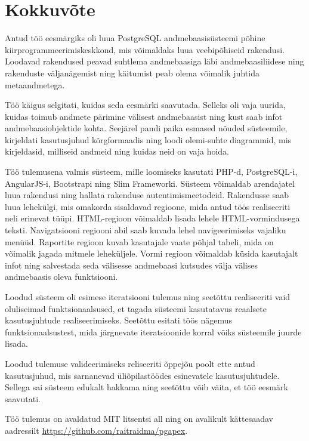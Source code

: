 \documentclass[a4paper,12pt]{article} %
\begin{document}
\section{Kokkuvõte}
Antud töö eesmärgiks oli luua PostgreSQL andmebaasisüsteemi põhine kiirprogrammeerimiskeskkond, mis võimaldaks luua veebipõhiseid rakendusi. Loodavad rakendused peavad suhtlema andmebaasiga läbi andmebaasiliidese ning rakenduste väljanägemist ning käitumist peab olema võimalik juhtida metaandmetega.\par
Töö käigus selgitati, kuidas seda eesmärki saavutada. Selleks oli vaja uurida, kuidas toimub andmete pärimine välisest andmebaasist ning kust saab infot andmebaasiobjektide kohta. Seejärel pandi paika esmased nõuded süsteemile, kirjeldati kasutusjuhud kõrgformaadis ning loodi olemi-suhte diagrammid, mis kirjeldasid, milliseid andmeid ning kuidas neid on vaja hoida.\par
Töö tulemusena valmis süsteem, mille loomiseks kasutati PHP-d, PostgreSQL-i, AngularJS-i, Bootstrapi ning Slim Frameworki. Süsteem võimaldab arendajatel luua rakendusi ning hallata rakenduse autentimismeetodeid. Rakendusse saab luua lehekülgi, mis omakorda sisaldavad regioone, mida antud töös realiseeriti neli erinevat tüüpi. HTML-regioon võimaldab lisada lehele HTML-vormindusega teksti. Navigatsiooni regiooni abil saab kuvada lehel navigeerimiseks vajaliku menüüd. Raportite regioon kuvab kasutajale vaate põhjal tabeli, mida on võimalik jagada mitmele leheküljele. Vormi regioon võimaldab küsida kasutajalt infot ning salvestada seda välisesse andmebaasi kutsudes välja välises andmebaasis oleva funktsiooni.\par
Loodud süsteem oli esimese iteratsiooni tulemus ning seetõttu realiseeriti vaid oluliseimad funktsionaalsused, et tagada süsteemi kasutatavus reaalsete kasutusjuhtude realiseerimiseks. Seetõttu esitati töös nägemus funktsionaalsustest, mida järgnevate iteratsioonide korral võiks süsteemile juurde lisada.\par
Loodud tulemuse valideerimiseks reliseeriti õppejõu poolt ette antud kasutusjuhud, mis sarnanevad üliõpilastöödes esinevatele kasutusjuhtudele. Sellega sai süsteem edukalt hakkama ning seetõttu võib väita, et töö eesmärk saavutati.\par
Töö tulemus on avaldatud MIT litsentsi all ning on avalikult kättesaadav aadressilt \newline \url{https://github.com/raitraidma/pgapex}.
\end{document}
